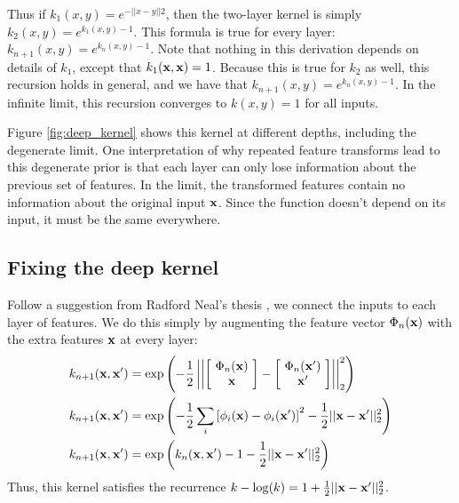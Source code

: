 \documentclass{article}
\begin{document}
%
Thus if $k_1(x,y) = e^{-||x - y||2}$, then the two-layer kernel is simply $k_2(x,y) = e^{k_1(x, y) - 1}$.  This formula is true for every layer: $k_{n+1}(x,y) = e^{k_n(x, y) - 1}$.
%
Note that nothing in this derivation depends on details of $k_1$, except that $k_1( {\bf{x}}, {\bf{x}}) = 1$.  Because this is true for $k_2$ as well, this recursion holds in general, and we have that $k_{n+1}(x,y) = e^{k_n(x, y) - 1}$.  In the infinite limit, this recursion converges to $k(x,y) = 1$ for all inputs.

Figure \ref{fig:deep_kernel} shows this kernel at different depths, including the degenerate limit.  One interpretation of why repeated feature transforms lead to this degenerate prior is that each layer can only lose information about the previous set of features.  In the limit, the transformed features contain no information about the original input ${\bf{x}}$.  Since the function doesn't depend on its input, it must be the same everywhere.



\subsection{Fixing the deep kernel}

Follow a suggestion from Radford Neal's thesis \cite{neal1995bayesian}, we connect the inputs to each layer of features.  We do this simply by augmenting the feature vector $\Phi_n({\bf{x}})$ with the extra features ${\bf{x}}$ at every layer:
%
\begin{align}
k_{n+1}({\bf{x}}, {\bf{x}}') & = \exp \left( -\frac{1}{2} \left|\left| \left[ \! \begin{array}{c} \Phi_n({\bf{x}}) \\ {\bf{x}} \end{array} \! \right]  - \left[ \! \begin{array}{c} \Phi_n({\bf{x}}') \\ {\bf{x}}' \end{array} \! \right] \right| \right|_2^2 \right) \\
k_{n+1}({\bf{x}}, {\bf{x}}') & = \exp \left( -\frac{1}{2} \sum_i \left[ \phi_i({\bf{x}}) - \phi_i({\bf{x}}') \right]^2 -\frac{1}{2} || {\bf{x}} - {\bf{x}}' ||_2^2 \right) \\
k_{n+1}({\bf{x}}, {\bf{x}}') & = \exp \left( k_n({\bf{x}}, {\bf{x}}') - 1 -\frac{1}{2} || {\bf{x}} - {\bf{x}}' ||_2^2 \right)
\end{align}
%
Thus, this kernel satisfies the recurrence $k - \log(k) = 1 + \frac{1}{2} || {\bf{x}} - {\bf{x}}' ||_2^2$.  
\end{document}
